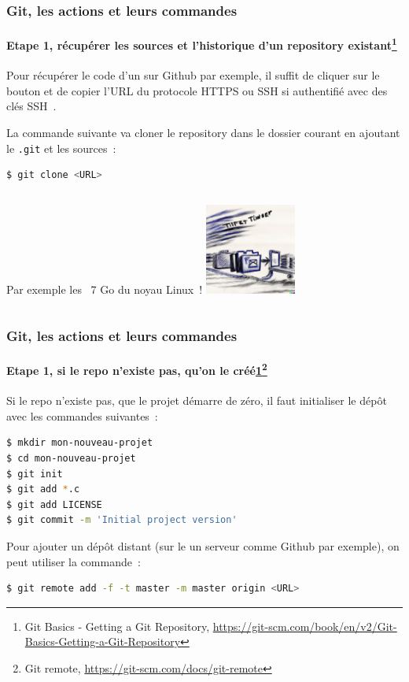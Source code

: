 \documentclass{beamer}
\begin{document}
    \begin{frame}[fragile]
        \frametitle{Git, les actions et leurs commandes}
        \framesubtitle{Etape 1, récupérer les sources et l'historique d'un repository existant\footnote{\label{progitgetrepo}Git Basics - Getting a Git Repository, \url{https://git-scm.com/book/en/v2/Git-Basics-Getting-a-Git-Repository}}}
        \transdissolve
        Pour récupérer le code d'un sur Github par exemple, il suffit de cliquer sur le bouton  et de copier l'URL du protocole HTTPS ou SSH si authentifié avec des clés SSH~.

        La commande suivante va cloner le repository dans le dossier courant en ajoutant le \lstinline{.git} et les sources~:
        \begin{lstlisting}[language=sh]
$ git clone <URL>
        \end{lstlisting}
        \begin{columns}
            Par exemple les ~7 Go du noyau Linux~!
            \centering
            \includegraphics[width=3cm]{image/git-clone-artwork.png}
        \end{columns}
    \end{frame}

    \begin{frame}[fragile]
        \frametitle{Git, les actions et leurs commandes}
        \framesubtitle{Etape 1, si le repo n'existe pas, qu'on le créé\cref{progitgetrepo}\footnote{Git remote, \url{https://git-scm.com/docs/git-remote}}}
        \transdissolve
        Si le repo n'existe pas, que le projet démarre de zéro, il faut initialiser le dépôt avec les commandes suivantes~:
        \begin{lstlisting}[language=sh]
$ mkdir mon-nouveau-projet
$ cd mon-nouveau-projet
$ git init
$ git add *.c
$ git add LICENSE
$ git commit -m 'Initial project version'
        \end{lstlisting}

        Pour ajouter un dépôt distant (sur le un serveur comme Github par exemple), on peut utiliser la commande~:
        \begin{lstlisting}[language=sh]
$ git remote add -f -t master -m master origin <URL>
        \end{lstlisting}
    \end{frame}
\end{document}
